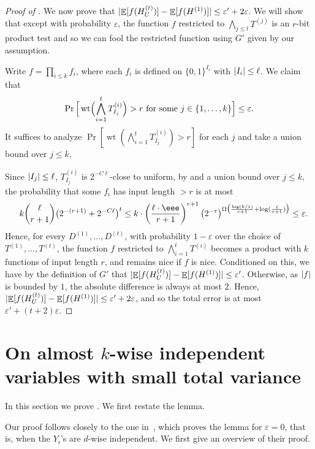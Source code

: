 \documentclass{toc}
\newcommand{\zo}{\{0,1\}}
\def\eps{\varepsilon}
\def\Blocklength{\ell}
\DeclarePairedDelimiter{\abs}{\lvert}{\rvert}
\DeclareMathOperator{\wtt}{wt}  %
\DeclareMathOperator*{\E}{\mathbb{E}}                 %
\begin{document}
\begin{proof}[Proof of {}]
We now prove that $\abs{\E[f(H^{(t)}_U)] - \E[f(H^{(1)})]} \le \eps' + 2\eps$.
We will show that except with probability $\eps$, the function $f$ restricted to 
$\bigwedge_{j \le t} T^{(j)}$ is an %
    $r$-bit  %
product test
%
and so we can fool the restricted function using $G'$ given by our assumption.

    Write $f = \prod_{i \le k} f_i$, where each $f_i$ is defined on $\zo^{I_i}$ with $\abs{I_i} \le \Blocklength$.
    We claim that
    \[
      \Pr \Big[ \wtt \Bigl(\bigwedge_{i=1}^t T^{(i)}_{I_j} \Bigr) > r \text{ for some $j \in \{1, \ldots, k\}$} \Big] \le \eps .
    \]
    It suffices to analyze $\Pr[\wtt(\bigwedge_{i=1}^t T_{I_j}^{(i)}) > r]$ for each $j$ and take a union bound over $j \le k$.

    Since $\abs{I_j} \le \Blocklength$, $T^{(i)}_{I_j}$ is $2^{-C\Blocklength}$-close to uniform, by  and a union bound over $j \le k$, the probability that some $f_i$ has input length $> r$ is at most
    \[
      \quad k \binom{\Blocklength}{r+1} \bigl (2^{-(r+1)} + 2^{-C\Blocklength} \bigr)^t
  \le k \cdot \left(\frac{\Blocklength\cdot\eee}{r+1}\right)^{r+1} \bigl( 2^{-r} \bigr)^{\Omega \bigl( \frac{\log(k/\eps)}{r+1} + \log(\frac{\Blocklength}{r+1}) \big)}
      \le \eps .
    \]
    Hence, for every $D^{(1)}, \ldots, D^{(t)}$, with probability $1 - \eps$ over the choice of $T^{(1)}, \ldots, T^{(t)}$, the function $f$ restricted to 
    $\bigwedge_{i=1}^t T^{(i)}$
    becomes a product with $k$ functions of input length $r$, and remains nice if $f$ is nice.
    Conditioned on this, we have by the definition of $G'$ that $\abs{ \E[f(H_U^{(t)})] - \E[f(H^{(1)})] } \le \eps'$.
    Otherwise, as $\abs{f}$ is bounded by $1$, the absolute difference is always
    at most $2$.
    Hence, $\abs{ \E[f(H_U^{(t)})] - \E[f(H^{(1)})] } \le \eps' + 2 \eps$, and so the total error is at most $\eps' + (t + 2) \eps$.
  \end{proof}

  \section{On almost \texorpdfstring{$k$}{}-wise independent variables with small total variance} \label{sec:DerGKM}

  In this section we prove .
  We first restate the lemma.

  \DerGKM*

  Our proof follows closely to the one in~\cite{GopalanKM18}, which proves the lemma for $\eps = 0$, that is, when the $Y_i$'s are $d$-wise independent.
  We first give an overview of their proof.
\end{document}
